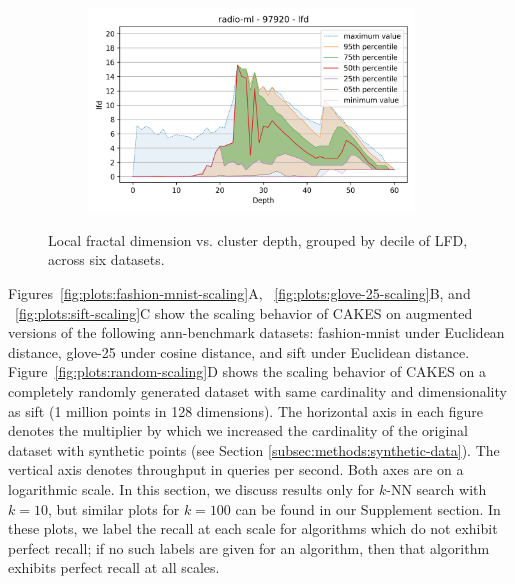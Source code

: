 \begin{figure}
\begin{subfigure}[b]{0.47\textwidth}
\label{fig:results:silva-lfd}
\end{subfigure}%
\begin{subfigure}[b]{0.47\textwidth}
\includegraphics[width=0.95\textwidth]{images/lfd_plots/radio-ml-97920-lfd.png}\\
\label{fig:results:radioml-lfd}
\end{subfigure}%


\caption{Local fractal dimension vs. cluster depth, grouped by decile of LFD, across six datasets.}
\end{figure}

Figures~\ref{fig:plots:fashion-mnist-scaling}A, ~\ref{fig:plots:glove-25-scaling}B, and ~\ref{fig:plots:sift-scaling}C show the scaling behavior of CAKES on augmented versions of the following ann-benchmark datasets: fashion-mnist under Euclidean distance, glove-25 under cosine distance, and sift under Euclidean distance. 
Figure~\ref{fig:plots:random-scaling}D shows the scaling behavior of CAKES on a completely randomly generated dataset with same cardinality and dimensionality as sift (1 million points in 128 dimensions).
The horizontal axis in each figure denotes the multiplier by which we increased the cardinality of the original dataset with synthetic points (see Section \ref{subsec:methods:synthetic-data}). 
The vertical axis denotes throughput in queries per second. Both axes are on a logarithmic scale. In this section, we discuss results only for $k$-NN search with $k = 10$, but similar plots for $k=100$ can be found in our Supplement section. In these plots, we label the recall at each scale for algorithms which do not exhibit perfect recall; if no such labels are given for an algorithm, then that algorithm exhibits perfect recall at all scales.


